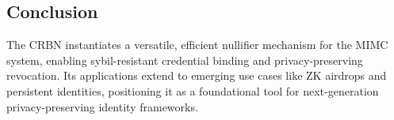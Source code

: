 \subsection{Conclusion}
The CRBN instantiates a versatile, efficient nullifier mechanism for the MIMC system, enabling sybil-resistant credential binding and privacy-preserving revocation. Its applications extend to emerging use cases like ZK airdrops and persistent identities, positioning it as a foundational tool for next-generation privacy-preserving identity frameworks.














% 
% 
% 
% 


    
    
    
